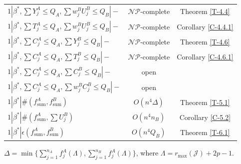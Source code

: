 \documentclass[12pt]{article}
\begin{document}
\begin{sloppypar}
\begin{table}[H]
\begin{center}
\begin{tabular}{|l|c|c|}
$1 | \beta^{*}, \sum Y_j^A \leq Q_A, \sum w_j^B U_j^B \leq Q_B|-$ & $\mathcal{NP}$-complete &Theorem \ref{T-4.4}\\
$1 | \beta^{*}, \sum T_j^A \leq Q_A, \sum w_j^B U_j^B \leq Q_B|-$ & $\mathcal{NP}$-complete &Corollary \ref{C-4.4.1} \\
$1 | \beta^{*}, \sum C_j^A \leq Q_A, \sum Y_j^B \leq Q_B|-$ & $\mathcal{NP}$-complete &Theorem \ref{T-4.6}\\
$1 | \beta^{*}, \sum C_j^A \leq Q_A, \sum T_j^B \leq Q_B|-$ & $\mathcal{NP}$-complete &Corollary \ref{C-4.6.1}\\
$1 | \beta^{*}, \sum C_j^A \leq Q_A, \sum C_j^B \leq Q_B|-$ & open & \\
$1 | \beta^{*}, \sum C_j^A \leq Q_A, \sum w_j^BC_j^B \leq Q_B|-$ & open & \\
$1 | \beta^{*}|\#(f_{\mathrm{sum}}^A, f_{\mathrm{sum}}^B)$ & $O(n^4 \Delta)$ &Theorem \ref{T-5.1}\\
$1 | \beta^{*}|\#(f_{\mathrm{sum}}^A, \sum U_j^B)$ & $O(n^4 n_B)$ &Corollary \ref{C-5.2}\\
$1 | \beta^{*}|\epsilon(f_{\mathrm{sum}}^A, f_{\mathrm{sum}}^B)$ & $O(n^4 Q_B)$ &Theorem \ref{T-6.1} \\ \hline
\end{tabular}
$\Delta=\min \{\sum_{j=1}^{n_A} f_j^A(\Lambda), \sum_{j=1}^{n_B} f_j^A(\Lambda)\}$, where $\Lambda=r_{\max}(\mathcal{J})+2p-1$.
\end{center}
\end{table}


\end{sloppypar}
\end{document}
